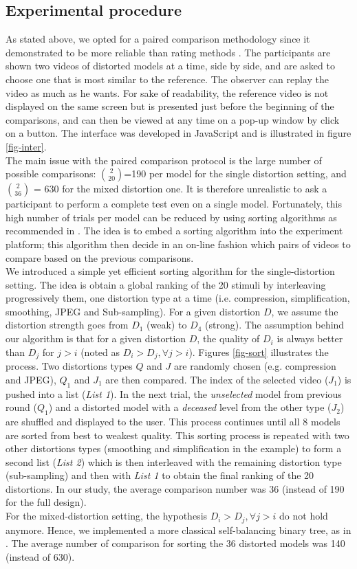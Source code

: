 \subsection{Experimental procedure}
As stated above, we opted for a paired comparison methodology since it demonstrated to be more reliable than rating methods \cite{Mantiuk2012}. The participants are shown two videos of distorted models at a time, side by side, and are asked to choose one that is most similar to the reference. The observer can replay the video as much as he wants. For sake of readability, the reference video is not displayed on the same screen but is presented just before the beginning of the comparisons, and can then be viewed at any time on a pop-up window by click on a button. The interface was developed in JavaScript and is illustrated in figure \ref{fig-inter}.\\
The main issue with the paired comparison protocol is the large number of possible comparisons: $\binom{2}{20}$=190 per model for the single distortion setting, and $\binom{2}{36}$ = 630 for the mixed distortion one. It is therefore unrealistic to ask a participant to perform a complete test even on a single model. Fortunately, this high number of trials per model can be reduced by using sorting algorithms as recommended in \cite{Silverstein2001,Mantiuk2012}. The idea is to embed a sorting algorithm into the experiment platform; this algorithm then decide in an on-line fashion which pairs of videos to compare based on the previous comparisons.\\
We introduced a simple yet efficient sorting algorithm for the single-distortion setting. The idea is obtain a global ranking of the 20 stimuli by interleaving progressively them, one distortion type at a time (i.e. compression, simplification, smoothing, JPEG and Sub-sampling). For a given distortion $D$, we assume the distortion strength goes from $D_1$ (weak) to $D_4$ (strong). The assumption behind our algorithm is that for a given distortion $D$, the quality of $D_i$ is always better than $D_j$ for $j>i$ (noted as $D_i>D_j, \forall j>i$). Figures \ref{fig-sort} illustrates the process. Two distortions types $Q$ and $J$ are randomly chosen (e.g. compression and JPEG), $Q_1$ and $J_1$ are then compared. The index of the selected video ($J_1$) is pushed into a list (\textit{List 1}). In the next trial, the \textit{unselected} model from previous round ($Q_1$) and a distorted model with a \textit{deceased} level from the other type ($J_2$) are shuffled and displayed to the user. This process continues until all 8 models are sorted from best to weakest quality. This sorting process is repeated with two other distortions types (smoothing and simplification in the example) to form a second list (\textit{List 2}) which is then interleaved with the remaining distortion type (sub-sampling) and then with \textit{List 1} to obtain the final ranking of the 20 distortions. In our study, the average comparison number was 36 (instead of 190 for the full design).\\
For the mixed-distortion setting, the hypothesis $D_i>D_j, \forall j>i$ do not hold anymore. Hence, we implemented a more classical self-balancing binary tree, as in \cite{Mantiuk2012}. The average number of comparison for sorting the 36 distorted models was 140 (instead of 630). 
